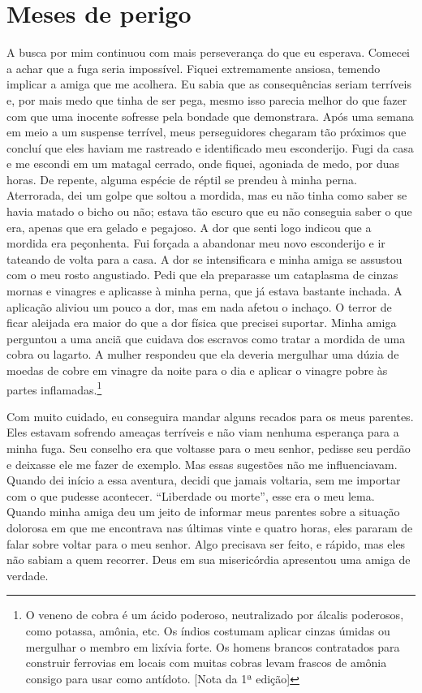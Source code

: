 \chapter*{Meses de perigo}

A busca por mim continuou com mais
perseverança do que eu esperava. Comecei a achar que a fuga seria
impossível. Fiquei extremamente ansiosa, temendo implicar a amiga que me
acolhera. Eu sabia que as consequências seriam terríveis e, por mais
medo que tinha de ser pega, mesmo isso parecia melhor do que fazer com
que uma inocente sofresse pela bondade que demonstrara. Após uma semana
em meio a um suspense terrível, meus perseguidores chegaram tão próximos
que concluí que eles haviam me rastreado e identificado meu esconderijo.
Fugi da casa e me escondi em um matagal cerrado, onde fiquei, agoniada
de medo, por duas horas. De repente, alguma espécie de réptil se prendeu
à minha perna. Aterrorada, dei um golpe que soltou a mordida, mas eu não
tinha como saber se havia matado o bicho ou não; estava tão escuro que
eu não conseguia saber o que era, apenas que era gelado e pegajoso. A
dor que senti logo indicou que a mordida era peçonhenta. Fui forçada a
abandonar meu novo esconderijo e ir tateando de volta para a casa. A dor
se intensificara e minha amiga se assustou com o meu rosto angustiado.
Pedi que ela preparasse um cataplasma de cinzas mornas e vinagres e
aplicasse à minha perna, que já estava bastante inchada. A aplicação
aliviou um pouco a dor, mas em nada afetou o inchaço. O terror de ficar
aleijada era maior do que a dor física que precisei suportar. Minha
amiga perguntou a uma anciã que cuidava dos escravos como tratar a
mordida de uma cobra ou lagarto. A mulher respondeu que ela deveria
mergulhar uma dúzia de moedas de cobre em vinagre da noite para o dia e
aplicar o vinagre pobre às partes inflamadas.\footnote{O veneno de cobra
é um ácido poderoso, neutralizado por álcalis poderosos, como potassa,
amônia, etc. Os índios costumam aplicar cinzas úmidas ou mergulhar o
membro em lixívia forte. Os homens brancos contratados para construir
ferrovias em locais com muitas cobras levam frascos de amônia consigo
para usar como antídoto. [Nota da 1ª edição]}

Com muito cuidado, eu conseguira mandar
alguns recados para os meus parentes. Eles estavam sofrendo ameaças
terríveis e não viam nenhuma esperança para a minha fuga. Seu conselho
era que voltasse para o meu senhor, pedisse seu perdão e deixasse ele me
fazer de exemplo. Mas essas sugestões não me influenciavam. Quando dei
início a essa aventura, decidi que jamais voltaria, sem me importar com
o que pudesse acontecer. ``Liberdade ou morte'', esse era o meu lema.
Quando minha amiga deu um jeito de informar meus parentes sobre a
situação dolorosa em que me encontrava nas últimas vinte e quatro horas,
eles pararam de falar sobre voltar para o meu senhor. Algo precisava ser
feito, e rápido, mas eles não sabiam a quem recorrer. Deus em sua
misericórdia apresentou uma amiga de verdade.

